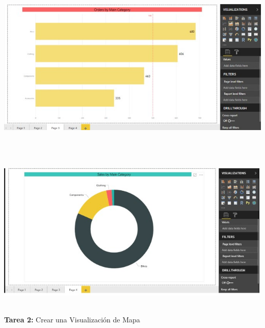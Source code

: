 \documentclass[12pt,letterpaper]{article}
\begin{document}
\begin{flushleft}
\begin{itemize}
\textbf{ }\\
\textbf{ }\\
\begin{center}
	\includegraphics[width=15cm]{./Imagenes/image37} 
	\end{center}
\textbf{ }\\
\textbf{ }\\
\begin{center}
	\includegraphics[width=15cm]{./Imagenes/image38} 
	\end{center}
\textbf{ }\\


\textbf{Tarea 2: } Crear una Visualización de Mapa \\
\textbf{ }\\


\end{itemize}
\end{flushleft}
\end{document}
